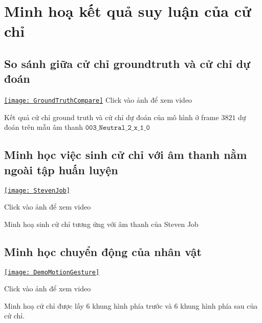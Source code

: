 \chapter{Minh hoạ kết quả suy luận của cử chỉ}
\label{Appendix3}

\section{So sánh giữa cử chỉ groundtruth và cử chỉ dự đoán}


\begin{center}
\centering
\href{https://youtu.be/22lNm2tvmrk}{%
\texttt{[image: GroundTruthCompare]}}
{\tiny Click vào ảnh để xem video}
\end{center}

Kết quả cử chỉ ground truth và cử chỉ dự đoán của mô hình ở frame $3821$ dự đoán trên mẫu âm thanh $\texttt{003\_Neutral\_2\_x\_1\_0}$

\section{Minh học việc sinh cử chỉ với âm thanh nằm ngoài tập huấn luyện}

{
	\begin{center}
		\centering
		\href{https://www.youtube.com/watch?v=B6nv1kQmi-Q}{%
		\texttt{[image: StevenJob]}}
		
		{\tiny Click vào ảnh để xem video}
	\end{center}

}

Minh hoạ sinh cử chỉ tương ứng với âm thanh của Steven Job



\section{Minh học chuyển động của nhân vật}

\begin{center}
{
	\centering
	\href{https://www.youtube.com/watch?v=9IIIZP3EJLg}{%
	\texttt{[image: DemoMotionGesture]}}
	
	{\tiny Click vào ảnh để xem video}
}
\end{center}
Minh hoạ cử chỉ được lấy 6 khung hình phía trước và 6 khung hình phía sau của cử chỉ.